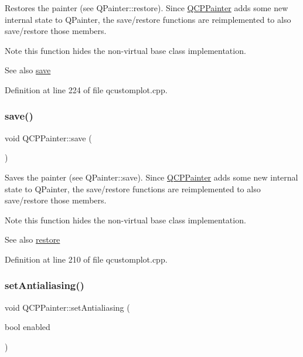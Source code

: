 Restores the painter (see Q\+Painter\+::restore). Since \hyperlink{class_q_c_p_painter}{Q\+C\+P\+Painter} adds some new internal state to Q\+Painter, the save/restore functions are reimplemented to also save/restore those members.

\begin{DoxyNote}{Note}
this function hides the non-\/virtual base class implementation.
\end{DoxyNote}
\begin{DoxySeeAlso}{See also}
\hyperlink{class_q_c_p_painter_a8fd6821ee6fecbfa04444c9062912abd}{save} 
\end{DoxySeeAlso}


Definition at line 224 of file qcustomplot.\+cpp.

\mbox{\label{class_q_c_p_painter_a8fd6821ee6fecbfa04444c9062912abd}} 
\subsubsection{\texorpdfstring{save()}{save()}}
{\footnotesize\ttfamily void Q\+C\+P\+Painter\+::save (\begin{DoxyParamCaption}{ }\end{DoxyParamCaption})}

Saves the painter (see Q\+Painter\+::save). Since \hyperlink{class_q_c_p_painter}{Q\+C\+P\+Painter} adds some new internal state to Q\+Painter, the save/restore functions are reimplemented to also save/restore those members.

\begin{DoxyNote}{Note}
this function hides the non-\/virtual base class implementation.
\end{DoxyNote}
\begin{DoxySeeAlso}{See also}
\hyperlink{class_q_c_p_painter_a64908e6298d5bbd83457dc987cc3a022}{restore} 
\end{DoxySeeAlso}


Definition at line 210 of file qcustomplot.\+cpp.

\mbox{\label{class_q_c_p_painter_aaba1deb9188244d9ea65b035112b4d05}} 
\subsubsection{\texorpdfstring{set\+Antialiasing()}{setAntialiasing()}}
{\footnotesize\ttfamily void Q\+C\+P\+Painter\+::set\+Antialiasing (\begin{DoxyParamCaption}\item[{bool}]{enabled }\end{DoxyParamCaption})}

